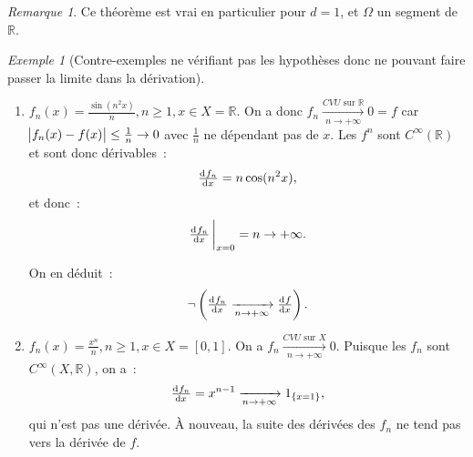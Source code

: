 \documentclass{report}
\theoremstyle{definition}
\theoremstyle{remark}
\newtheorem*{rmq}{Remarque}
\newtheorem{ex}{Exemple}[chapter]
\numberwithin{equation}{section}
\newcommand{\R}{\mathbb R}
\newcommand{\CONV}[5]{\xrightarrow[#2 \to #3]{#4 \text{ #5 } #1}}
\newcommand{\CVU}[3]{\CONV{#1}{#2}{#3}{CVU}{sur}}
\newcommand{\pinfty}{{+\infty}}
\begin{document}
			\begin{rmq} Ce théorème est vrai en particulier pour $d = 1$, et $\Omega$ un segment de $\R$. \end{rmq}

			\begin{ex}[Contre-exemples ne vérifiant pas les hypothèses donc ne pouvant faire passer la limite dans la dérivation]
			\begin{enumerate}
				\item $f_n(x) = \frac {\sin(n^2x)}n, n \geq 1, x \in X = \R$. On a donc $f_n \CVU \R n\pinfty 0 = f$ car $\abs {f_n(x) - f(x)} \leq \frac 1n \to 0$
					  avec $\frac 1n$ ne dépendant pas de $x$. Les $f^n$ sont $C^\infty(\R)$ et sont donc dérivables~:
					  \begin{equation}
						\od {f_n}x = n\cos(n^2x),
					\end{equation}
					  et donc~:
					  \begin{equation}
						\od {f_n}x\sVert[3]_{x=0} = n \to \pinfty.
					\end{equation}

					  On en déduit~:
					  \begin{equation}
						\lnot\left(\od {f_n}x \xrightarrow[n \to \pinfty]{} \od fx\right).
					\end{equation}

				\item $f_n(x) = \frac {x^n}n, n \geq 1, x \in X = [0, 1]$. On a $f_n \CVU Xn\pinfty 0$. Puisque les $f_n$ sont $C^\infty(X, \R)$, on a~:
					  \begin{equation}
						\od {f_n}x = x^{n-1} \xrightarrow[n \to \pinfty]{} 1_{\{x=1\}},
					\end{equation}
					  qui n'est pas une dérivée. À nouveau, la suite des dérivées des $f_n$ ne tend pas vers la dérivée de $f$.
			\end{enumerate}
			\end{ex}
\end{document}
